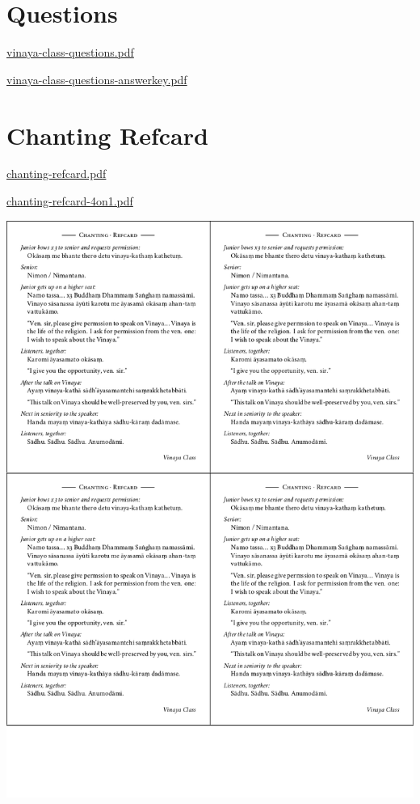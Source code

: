 \section{Questions}

\href{./includes/docs/vinaya-class-questions.pdf}{vinaya-class-questions.pdf}

\href{./includes/docs/vinaya-class-questions-answerkey.pdf}{vinaya-class-questions-answerkey.pdf}

\section{Chanting Refcard}

\href{./includes/docs/chanting-refcard.pdf}{chanting-refcard.pdf}

\href{./includes/docs/chanting-refcard-4on1.pdf}{chanting-refcard-4on1.pdf}

\href{./includes/docs/chanting-refcard-4on1.pdf}{\includegraphics{./includes/docs/chanting-refcard-4on1-thumb.png}}

